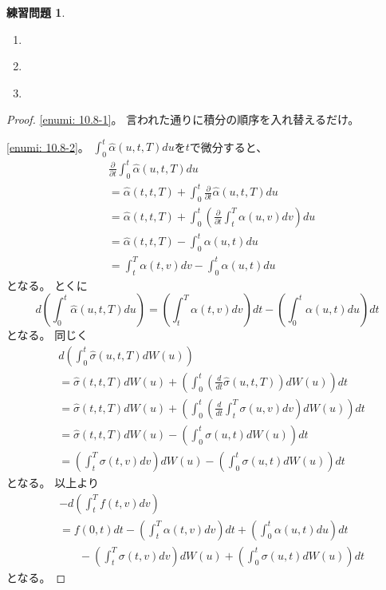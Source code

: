 \documentclass[uplatex]{jsarticle}
\theoremstyle{definition}
\newtheorem{prob}[prob]{練習問題}
\begin{document}
\begin{prob}\label{prob: 10.8}
  \begin{enumerate}
    \item \label{enumi: 10.8-1}
    \item \label{enumi: 10.8-2}
    \item \label{enumi: 10.8-3}
  \end{enumerate}
\end{prob}

\begin{proof}
  \ref{enumi: 10.8-1}。
  言われた通りに積分の順序を入れ替えるだけ。

  \ref{enumi: 10.8-2}。
  \(\int_0^t\hat{\alpha}(u,t,T)du\)を\(t\)で微分すると、
  \begin{align*}
    &\frac{\partial}{\partial t} \int_0^t \hat{\alpha}(u,t,T) du \\
    &= \hat{\alpha}(t,t,T)
    + \int_0^t \frac{\partial}{\partial t} \hat{\alpha}(u,t,T) du \\
    &= \hat{\alpha}(t,t,T)
    + \int_0^t \left( \frac{\partial}{\partial t} \int_t^T \alpha(u,v) dv
    \right) du \\
    &= \hat{\alpha}(t,t,T) - \int_0^t \alpha(u,t) du \\
    &= \int_t^T\alpha(t,v)dv - \int_0^t \alpha(u,t) du
  \end{align*}
  となる。
  とくに
  \[
  d\left( \int_0^t \hat{\alpha}(u,t,T) du\right)
  = \left( \int_t^T\alpha(t,v)dv\right)dt
  - \left( \int_0^t \alpha(u,t) du\right)dt
  \]
  となる。
  同じく
  \begin{align*}
    &d\left( \int_0^t \hat{\sigma}(u,t,T) dW(u)\right) \\
    &= \hat{\sigma}(t,t,T) dW(u)
    + \left( \int_0^t \left( \frac{d}{dt}\hat{\sigma}(u,t,T)
    \right) dW(u) \right)dt \\
    &= \hat{\sigma}(t,t,T) dW(u)
    + \left( \int_0^t \left( \frac{d}{dt}\int_t^T\sigma(u,v)
    dv \right) dW(u) \right) dt \\
    &= \hat{\sigma}(t,t,T) dW(u)
    - \left( \int_0^t \sigma(u,t) dW(u) \right) dt \\
    &= \left( \int_t^T\sigma(t,v)dv \right) dW(u)
    - \left( \int_0^t \sigma(u,t) dW(u) \right) dt
  \end{align*}
  となる。
  以上より
  \begin{align*}
    &- d\left( \int_t^Tf(t,v)dv \right) \\
    &= f(0,t)dt
    - \left( \int_t^T\alpha(t,v)dv\right)dt
    + \left( \int_0^t \alpha(u,t) du\right)dt \\
    &\ \ \ \ \ \ \ \
    - \left( \int_t^T\sigma(t,v)dv \right) dW(u)
    + \left( \int_0^t \sigma(u,t) dW(u) \right) dt
  \end{align*}
  となる。


\end{proof}
\end{document}
